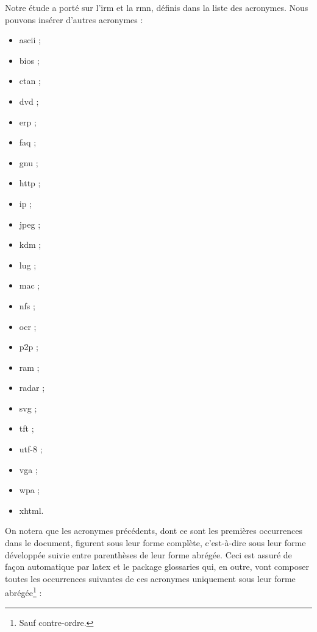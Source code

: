 \documentclass[12pt,space=onehalf,version=final]{yathesis}
\begin{document}
Notre étude a porté sur l'\gls{irm} et la \gls{rmn}, définis dans la
liste des acronymes. Nous pouvons insérer d'autres
acronymes :
\begin{itemize}
\item \gls{ascii} ;
\item \gls{bios} ;
\item \gls{ctan} ;
\item \gls{dvd} ;
\item \gls{erp} ;
\item \gls{faq} ;
\item \gls{gnu} ;
\item \gls{http} ;
\item \gls{ip} ;
\item \gls{jpeg} ;
\item \gls{kdm} ;
\item \gls{lug} ;
\item \gls{mac} ;
\item \gls{nfs} ;
\item \gls{ocr} ;
\item \gls{p2p} ;
\item \gls{ram} ;
\item \gls{radar} ;
\item \gls{svg} ;
\item \gls{tft} ;
\item \gls{utf-8} ;
\item \gls{vga} ;
\item \gls{wpa} ;
\item \gls{xhtml}.
\end{itemize}
On notera que les acronymes précédents, dont ce sont les premières
occurrences dans le document, figurent sous leur forme complète,
c'est-à-dire sous leur forme développée suivie entre parenthèses de
leur forme abrégée. Ceci est assuré de façon automatique par
\gls{latex} et le package \textsf{glossaries} qui, en outre, vont
composer toutes les occurrences suivantes de ces acronymes
uniquement sous leur forme abrégée\footnote{Sauf contre-ordre.} :
\end{document}
